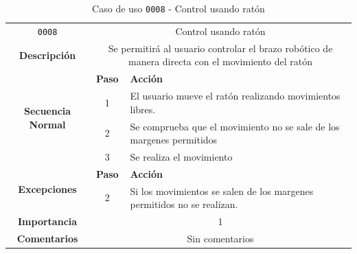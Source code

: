 \begin{table}[H]
    \centering
    \begin{tabularx}{\textwidth}{|c|c|X|}
        \cline{1-3}
        \texttt{0008}        & \multicolumn{2}{c|}{Control usando ratón}                                      
        \\ \cline{1-3}
        \textbf{Descripción} & \multicolumn{2}{m{13cm}|}{Se permitirá al usuario controlar el brazo robótico de manera directa con el movimiento del ratón}
        \\ \cline{1-3}
        \multirow{4}{*}{\textbf{Secuencia Normal}} & \textbf{Paso} & \textbf{Acción}
        \\ \cline{2-3}                    &   1  & El usuario mueve el ratón realizando movimientos libres.
        \\ \cline{2-3}                    &   2  & Se comprueba que el movimiento no se sale de los margenes permitidos
        \\ \cline{2-3}                    &   3  & Se realiza el movimiento
        \\ \cline{1-3}
        \multirow{2}{*}{\textbf{Excepciones}} & \textbf{Paso} & \textbf{Acción}
        \\ \cline{2-3}                    &   2   &  Si los movimientos se salen de los margenes permitidos no se realizan.
        \\ \cline{1-3}
        \textbf{Importancia}                 & \multicolumn{2}{c|}{1}           
        \\ \cline{1-3}
        \textbf{Comentarios}                 & \multicolumn{2}{c|}{Sin comentarios}
        \\ \cline{1-3}
    \end{tabularx}
    \caption{Caso de uso \texttt{0008} - Control usando ratón}
    \label{tab:CU0008}
    \label{tab:caso_de_uso_control_usando_ratón}
\end{table}

